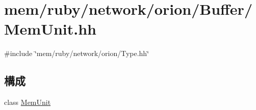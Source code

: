 \hypertarget{MemUnit_8hh}{
\section{mem/ruby/network/orion/Buffer/MemUnit.hh}
\label{MemUnit_8hh}
}
{\ttfamily \#include \char`\"{}mem/ruby/network/orion/Type.hh\char`\"{}}\par
\subsection*{構成}
\begin{DoxyCompactItemize}
\item 
class \hyperlink{classMemUnit}{MemUnit}
\end{DoxyCompactItemize}
